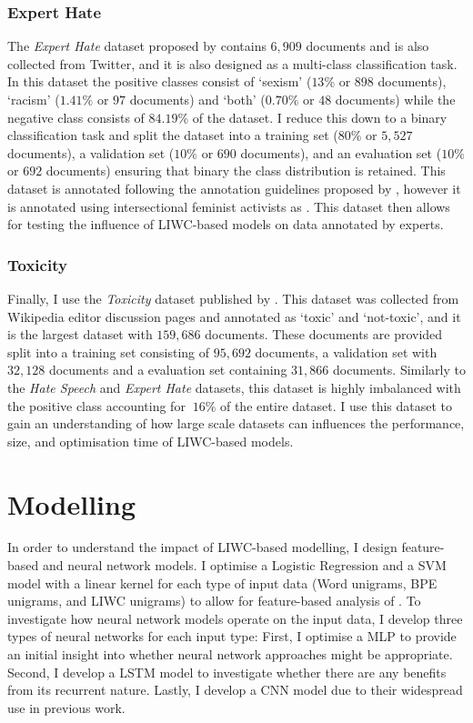 \subsubsection{Expert Hate}  
The \textit{Expert Hate} dataset proposed by \citet{Waseem:2016} contains $6,909$ documents and is also collected from Twitter, and it is also designed as a multi-class classification task.  
In this dataset the positive classes consist of `sexism' ($13\%$ or $898$ documents), `racism' ($1.41\%$ or $97$ documents) and `both' ($0.70\%$ or $48$ documents) while the negative class consists of $84.19\%$ of the dataset.  
I reduce this down to a binary classification task and split the dataset into a training set ($80\%$ or $5,527$ documents), a validation set ($10\%$ or $690$ documents), and an evaluation set ($10\%$ or $692$ documents) ensuring that binary the class distribution is retained.  
This dataset is annotated following the annotation guidelines proposed by \citet{Waseem-Hovy:2016}, however it is annotated using intersectional feminist activists as .  
This dataset then allows for testing the influence of LIWC-based models on data annotated by experts.  
  
\subsubsection{Toxicity}  
Finally, I use the \textit{Toxicity} dataset published by \citet{Wulczyn:2017}.  
This dataset was collected from Wikipedia editor discussion pages and annotated as `toxic' and `not-toxic', and it is the largest dataset with $159,686$ documents.  
These documents are provided split into a training set consisting of $95,692$ documents, a validation set with $32,128$ documents and a evaluation set containing $31,866$ documents.  
Similarly to the \textit{Hate Speech} and \textit{Expert Hate} datasets, this dataset is highly imbalanced with the positive class accounting for $~16\%$ of the entire dataset.  
I use this dataset to gain an understanding of how large scale datasets can influences the performance, size, and optimisation time of LIWC-based models.  
  
\section{Modelling}\label{sec:LIWC_modelling}  
In order to understand the impact of LIWC-based modelling, I design feature-based and neural network models.  
I optimise a Logistic Regression  and a SVM model with a linear kernel for each type of input data (Word unigrams, BPE unigrams, and LIWC unigrams) to allow for feature-based analysis of .  
To investigate how neural network models operate on the input data, I develop three types of neural networks for each input type:   
First, I optimise a MLP to provide an initial insight into whether neural network approaches might be appropriate.   
Second, I develop a LSTM model to investigate whether there are any benefits from its recurrent nature.  
Lastly, I develop a CNN model due to their widespread use in previous work.  
  
